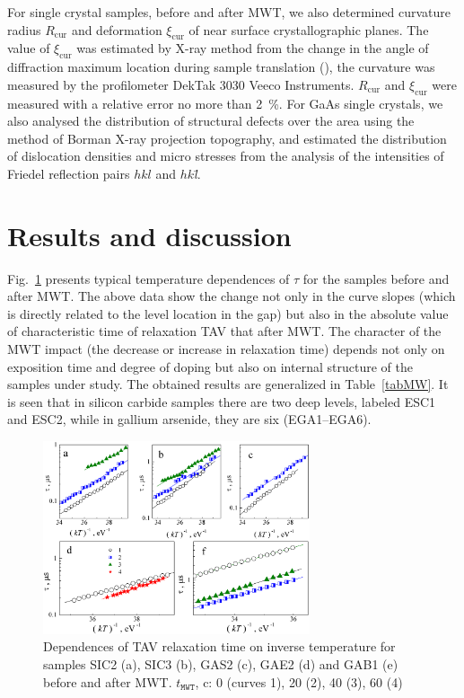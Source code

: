 \documentclass[final,3p,times,twocolumn,authoryear]{elsarticle}
\begin{document}
For single crystal samples,  before and after MWT, we also determined curvature radius $R_\mathrm{cur}$
and deformation $\xi_\mathrm{cur}$ of near surface crystallographic planes.
The value of  $\xi_\mathrm{cur}$ was estimated by X-ray method from the change in the angle of diffraction
maximum location  during sample translation (\cite{Godwod}),
the curvature was measured by the profilometer DekTak 3030 Veeco Instruments.
$R_\mathrm{cur}$ and $\xi_\mathrm{cur}$ were measured with a relative error no more than 2~\%.
For GaAs single crystals, we also analysed the distribution of structural defects over the area using the method of
Borman X-ray projection topography, and estimated the distribution of dislocation  densities and micro stresses from the
analysis of the intensities of Friedel reflection pairs $hkl$ and $hk$\emph{\={l}}.






\section{Results and discussion}\label{sec3}

Fig.~\ref{figTauTAV} presents typical temperature dependences of $\tau$ for the samples before and after MWT.
The above data show the change not only in the curve slopes (which is directly related to the level location in the gap)
but also in the absolute value of  characteristic time of relaxation TAV that after MWT.
The character of the MWT impact (the decrease or increase in relaxation time) depends not only on exposition time and degree of doping but also on internal structure of the samples under study.
The obtained results are generalized in Table~\ref{tabMW}.
It is seen that in silicon carbide samples there are two deep levels, labeled ESC1 and ESC2, while in gallium arsenide, they are six (EGA1–EGA6).



\begin{figure}
\center
\includegraphics[width=0.7\textwidth]{Fig3}
\caption{\label{figTauTAV}
Dependences of TAV relaxation time on inverse temperature for samples SIC2 (a), SIC3 (b), GAS2 (c), GAE2 (d) and GAB1 (e) before and after MWT.
$t_\mathtt{MWT}$, c: 0 (curves 1), 20 (2), 40 (3), 60 (4)
}%
\end{figure}
\end{document}
